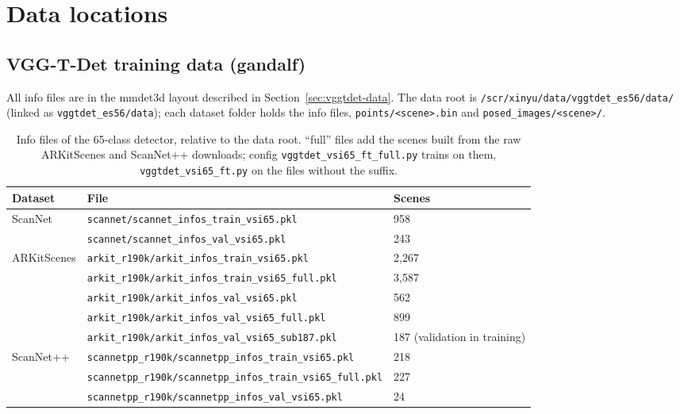 
\section{Data locations}
\label{sec:data}

\subsection{VGG-T-Det training data (gandalf)}

All info files are in the mmdet3d layout described in Section~\ref{sec:vggtdet-data}. The data root is
\texttt{/scr/xinyu/data/vggtdet\_es56/data/} (linked as \texttt{vggtdet\_es56/data}); each dataset folder holds
the info files, \texttt{points/<scene>.bin} and \texttt{posed\_images/<scene>/}.

\begin{table}[h]
\centering
\caption{Info files of the 65-class detector, relative to the data root. ``full'' files add the scenes built from
the raw ARKitScenes and ScanNet++ downloads; config \texttt{vggtdet\_vsi65\_ft\_full.py} trains on them,
\texttt{vggtdet\_vsi65\_ft.py} on the files without the suffix.}
\label{tab:data-vggtdet}
\small
\begin{tabular}{lll}
\toprule
Dataset & File & Scenes \\
\midrule
ScanNet      & \texttt{scannet/scannet\_infos\_train\_vsi65.pkl}           & 958 \\
             & \texttt{scannet/scannet\_infos\_val\_vsi65.pkl}             & 243 \\
ARKitScenes  & \texttt{arkit\_r190k/arkit\_infos\_train\_vsi65.pkl}        & 2,267 \\
             & \texttt{arkit\_r190k/arkit\_infos\_train\_vsi65\_full.pkl}  & 3,587 \\
             & \texttt{arkit\_r190k/arkit\_infos\_val\_vsi65.pkl}          & 562 \\
             & \texttt{arkit\_r190k/arkit\_infos\_val\_vsi65\_full.pkl}    & 899 \\
             & \texttt{arkit\_r190k/arkit\_infos\_val\_vsi65\_sub187.pkl}  & 187 (validation in training) \\
ScanNet++    & \texttt{scannetpp\_r190k/scannetpp\_infos\_train\_vsi65.pkl}       & 218 \\
             & \texttt{scannetpp\_r190k/scannetpp\_infos\_train\_vsi65\_full.pkl} & 227 \\
             & \texttt{scannetpp\_r190k/scannetpp\_infos\_val\_vsi65.pkl}         & 24 \\
\bottomrule
\end{tabular}
\end{table}

